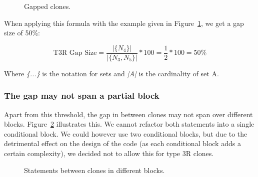 \begin{figure}[H]
\begin{parcolumns}{2}
\end{parcolumns}
\caption{Gapped clones.}
\label{fig:gappedclones}
\end{figure}

When applying this formula with the example given in Figure~\ref{fig:gappedclones}, we get a gap size of 50\%:

\begin{equation}\label{eq:type3r}
\text{T3R Gap Size}=\frac{|\{N_{4}\}|}{|\{N_{3}, N_{5}\}|}*100 = \frac{1}{2}*100 = 50\%
\end{equation}

Where \textit{\{...\}} is the notation for sets and \textit{|A|} is the cardinality of set A.

\subsubsection{The gap may not span a partial block} \label{sec:t3rpartialblock}
Apart from this threshold, the gap in between clones may not span over different blocks. Figure~\ref{fig:type3invalid} illustrates this. We cannot refactor both statements into a single conditional block. We could however use two conditional blocks, but due to the detrimental effect on the design of the code (as each conditional block adds a certain complexity), we decided not to allow this for type 3R clones.

\begin{figure}[H]
\begin{parcolumns}{2}
\end{parcolumns}
\caption{Statements between clones in different blocks.}
\label{fig:type3invalid}
\end{figure}

